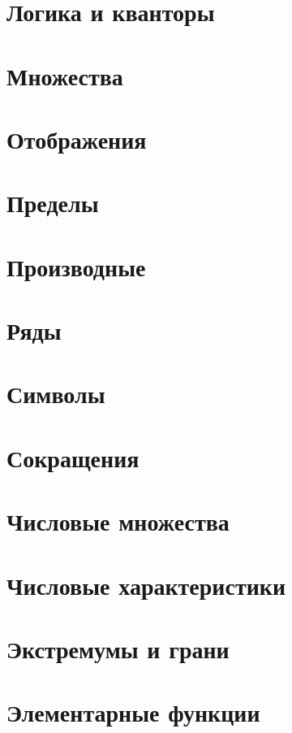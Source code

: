 \section{Логика и кванторы}
    


\section{Множества}
    


\section{Отображения}
    

\section{Пределы}
    


\section{Производные}
    


\section{Ряды}
    


\section{Символы}
    


\section{Сокращения}
    


\section{Числовые множества}
    


\section{Числовые характеристики}
    


\section{Экстремумы и грани}
    


\section{Элементарные функции}
    


\renewcommand{\arraystretch}{\arraystretchRestore}
\setlength{\tabcolsep}{\tabcolsepRestore}